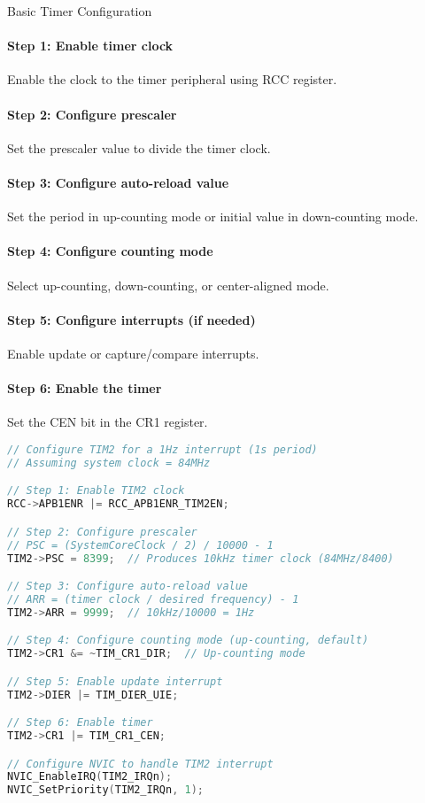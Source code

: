 \begin{KR}{Basic Timer Configuration}
\paragraph{Step 1: Enable timer clock}
Enable the clock to the timer peripheral using RCC register.
\paragraph{Step 2: Configure prescaler}
Set the prescaler value to divide the timer clock.
\paragraph{Step 3: Configure auto-reload value}
Set the period in up-counting mode or initial value in down-counting mode.
\paragraph{Step 4: Configure counting mode}
Select up-counting, down-counting, or center-aligned mode.
\paragraph{Step 5: Configure interrupts (if needed)}
Enable update or capture/compare interrupts.
\paragraph{Step 6: Enable the timer}
Set the CEN bit in the CR1 register.

\begin{lstlisting}[language=C, style=basesmol]
// Configure TIM2 for a 1Hz interrupt (1s period)
// Assuming system clock = 84MHz

// Step 1: Enable TIM2 clock
RCC->APB1ENR |= RCC_APB1ENR_TIM2EN;

// Step 2: Configure prescaler
// PSC = (SystemCoreClock / 2) / 10000 - 1
TIM2->PSC = 8399;  // Produces 10kHz timer clock (84MHz/8400)

// Step 3: Configure auto-reload value
// ARR = (timer clock / desired frequency) - 1
TIM2->ARR = 9999;  // 10kHz/10000 = 1Hz

// Step 4: Configure counting mode (up-counting, default)
TIM2->CR1 &= ~TIM_CR1_DIR;  // Up-counting mode

// Step 5: Enable update interrupt
TIM2->DIER |= TIM_DIER_UIE;

// Step 6: Enable timer
TIM2->CR1 |= TIM_CR1_CEN;

// Configure NVIC to handle TIM2 interrupt
NVIC_EnableIRQ(TIM2_IRQn);
NVIC_SetPriority(TIM2_IRQn, 1);
\end{lstlisting}
\end{KR}

